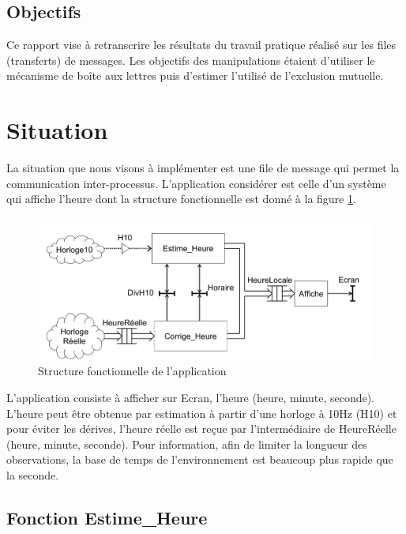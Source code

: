 \documentclass[french]{article}
\begin{document}
	
	\subsection{Objectifs}
	Ce rapport vise à retranscrire les résultats du travail pratique réalisé sur les files (transferts) de messages. Les objectifs des manipulations étaient d'utiliser le mécanisme de boîte aux lettres puis d'estimer l'utilisé de l'exclusion mutuelle.
	
	\newpage
	
	\section{Situation}
	
	
	La situation que nous visons à implémenter est une file de message qui permet la communication inter-processus. L'application considérer est celle d'un système qui affiche l'heure dont la structure fonctionnelle est donné à la figure \ref{fig:structure_fontionnelle}.
	
	\begin{figure}[H]
		\centering
		\includegraphics[width=13cm]{photo/situation}
		\caption{Structure fonctionnelle de l'application}
		\label{fig:structure_fontionnelle}
	\end{figure}
	
	L’application consiste à afficher sur Ecran, l’heure (heure, minute, seconde). L’heure
peut être obtenue par estimation à partir d’une horloge à 10Hz (H10) et pour éviter les
dérives, l’heure réelle est reçue par l’intermédiaire de HeureRéelle (heure, minute, seconde).
	Pour information, afin de limiter la longueur des observations, la base de temps de
l’environnement est beaucoup plus rapide que la seconde.
	

	\subsection*{Fonction Estime\_Heure}
	
\end{document}

